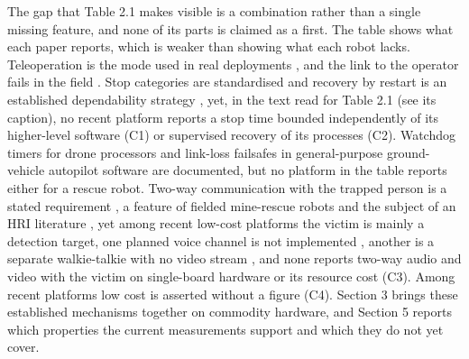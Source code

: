 The gap that Table 2.1 makes visible is a combination rather than a single missing feature, and none of its parts is claimed as a first. The table shows what each paper reports, which is weaker than showing what each robot lacks. Teleoperation is the mode used in real deployments \cite{daun2023}, and the link to the operator fails in the field \cite{nagatani2013}. Stop categories are standardised \cite{iec60204} and recovery by restart is an established dependability strategy \cite{candea2004}, yet, in the text read for Table 2.1 (see its caption), no recent platform reports a stop time bounded independently of its higher-level software (C1) or supervised recovery of its processes (C2). Watchdog timers for drone processors \cite{madhushankara2024} and link-loss failsafes in general-purpose ground-vehicle autopilot software \cite{ardupilot_rover_failsafe} are documented, but no platform in the table reports either for a rescue robot. Two-way communication with the trapped person is a stated requirement \cite{schneider2016}, a feature of fielded mine-rescue robots \cite{bakzadeh2026} and the subject of an HRI literature \cite{bethel2007,murphy2010,srinivasan2012}, yet among recent low-cost platforms the victim is mainly a detection target, one planned voice channel is not implemented \cite{khattab2025}, another is a separate walkie-talkie with no video stream \cite{manuel2022}, and none reports two-way audio and video with the victim on single-board hardware or its resource cost (C3). Among recent platforms low cost is asserted without a figure (C4). Section 3 brings these established mechanisms together on commodity hardware, and Section 5 reports which properties the current measurements support and which they do not yet cover.
